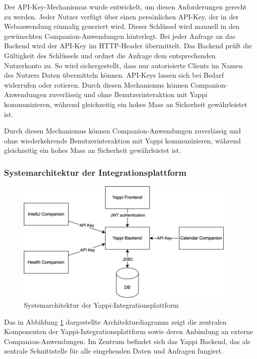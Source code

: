 \documentclass[12pt,a4paper]{report}
\begin{document}
Der API-Key-Mechanismus wurde entwickelt, um diesen Anforderungen gerecht zu werden. Jeder Nutzer verfügt über einen persönlichen
API-Key, der in der Webanwendung einmalig generiert wird. Dieser Schlüssel wird manuell in den gewünschten Companion-Anwendungen
hinterlegt. Bei jeder Anfrage an das Backend wird der API-Key im HTTP-Header übermittelt. Das Backend prüft die Gültigkeit des 
Schlüssels und ordnet die Anfrage dem entsprechenden Nutzerkonto zu. So wird sichergestellt, dass nur autorisierte Clients im
Namen des Nutzers Daten übermitteln können. API-Keys lassen sich bei Bedarf widerrufen oder rotieren. Durch diesen Mechanismus
können Companion-Anwendungen zuverlässig und ohne Benutzerinteraktion mit Yappi kommunizieren, während gleichzeitig ein hohes Mass
an Sicherheit gewährleistet ist.

Durch diesen Mechanismus können Companion-Anwendungen zuverlässig und ohne wiederkehrende Benutzerinteraktion mit Yappi 
kommunizieren, während gleichzeitig ein hohes Mass an Sicherheit gewährleistet ist.

\subsubsection{Systemarchitektur der Integrationsplattform}

\begin{figure}[!htbp]
  \centering
  \includegraphics[width=0.95\textwidth]{../figures/plattform-system-diagram.drawio.png}
  \caption{Systemarchitektur der Yappi-Integrationsplattform}
  \label{fig:systemarchitektur}
\end{figure}

Das in Abbildung \ref{fig:systemarchitektur} dargestellte Architekturdiagramm zeigt die zentralen Komponenten der 
Yappi-Integrationsplattform sowie deren Anbindung an externe Companion-Anwendungen. Im Zentrum befindet sich das Yappi Backend,
das als zentrale Schnittstelle für alle eingehenden Daten und Anfragen fungiert.
\end{document}
